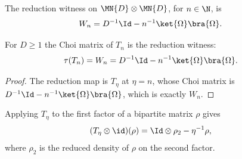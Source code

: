 \begin{definition}
    \label{def:reduction_witness}
    \leanok
    The reduction witness on $\MN{D}\otimes\MN{D}$, for $n\in\N$, is
    \begin{align}
        W_n & =D^{-1}\Id-n^{-1}\ket{\Omega}\bra{\Omega}.
        \notag
    \end{align}
\end{definition}

\begin{theorem}
    \label{thm:choi_matrix_reduction_witness}
    \leanok
    For $D\ge 1$ the Choi matrix of $T_n$ is the reduction witness:
    \begin{align}
        \tau(T_n) & =W_n=D^{-1}\Id-n^{-1}\ket{\Omega}\bra{\Omega}.
        \notag
    \end{align}
\end{theorem}

\begin{proof}
    \leanok
    The reduction map is $T_\eta$ at $\eta=n$, whose Choi matrix is
    $D^{-1}\Id-n^{-1}\ket{\Omega}\bra{\Omega}$, which is exactly $W_n$.
\end{proof}

\begin{theorem}
    \label{thm:tensor_map_id_t_eta}
    \leanok
    Applying $T_\eta$ to the first factor of a bipartite matrix $\rho$ gives
    \begin{align}
        (T_\eta\otimes\id)(\rho) & =\Id\otimes\rho_2-\eta^{-1}\rho,
        \notag
    \end{align}
    where $\rho_2$ is the reduced density of $\rho$ on the second factor.
\end{theorem}

